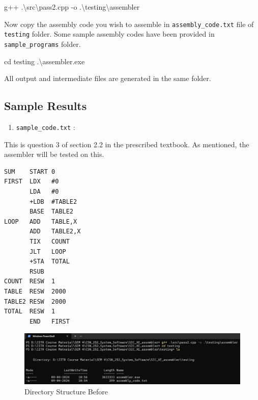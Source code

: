 \documentclass[
]{article}
\newenvironment{Shaded}{}{}
\newcommand{\NormalTok}[1]{#1}
\providecommand{\tightlist}{%
  \setlength{\itemsep}{0pt}\setlength{\parskip}{0pt}}
\begin{document}
\begin{Shaded}
\begin{Highlighting}[]
\NormalTok{g++ .\textbackslash{}src\textbackslash{}pass2.cpp {-}o .\textbackslash{}testing\textbackslash{}assembler}
\end{Highlighting}
\end{Shaded}

Now copy the assembly code you wish to assemble in
\texttt{assembly\_code.txt} file of \texttt{testing} folder. Some sample
assembly codes have been provided in \texttt{sample\_programs} folder.

\begin{Shaded}
\begin{Highlighting}[]
\NormalTok{cd testing}
\NormalTok{.\textbackslash{}assembler.exe}
\end{Highlighting}
\end{Shaded}

All output and intermediate files are generated in the same folder.

\subsection{Sample Results}\label{sample-results}

\begin{enumerate}
\def\labelenumi{\arabic{enumi})}
\tightlist
\item
  \texttt{sample\_code.txt} :
\end{enumerate}

This is question 3 of section 2.2 in the prescribed textbook. As
mentioned, the assembler will be tested on this.

\begin{verbatim}
SUM    START 0
FIRST  LDX   #0
       LDA   #0
       +LDB  #TABLE2
       BASE  TABLE2
LOOP   ADD   TABLE,X
       ADD   TABLE2,X 
       TIX   COUNT
       JLT   LOOP
       +STA  TOTAL
       RSUB
COUNT  RESW  1
TABLE  RESW  2000
TABLE2 RESW  2000
TOTAL  RESW  1
       END   FIRST
\end{verbatim}

\begin{figure}[H]
\centering
\includegraphics{img/image.png}
\caption{Directory Structure Before}
\end{figure}
\end{document}
